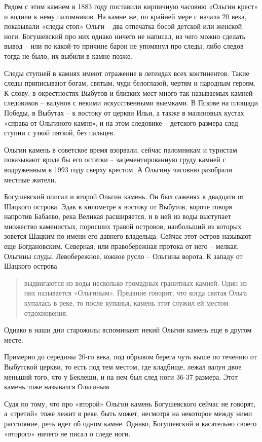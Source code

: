 Рядом с этим камнем в 1883 году поставили кирпичную часовню «Ольгин крест» и водили к нему паломников. На камне же, по крайней мере с начала 20 века, показывали «следы стоп» Ольги – два отпечатка босой детской или женской ноги. Богушевский про них однако ничего не написал, из чего можно сделать вывод – или по какой-то причине барон не упомянул про следы, либо следов тогда не было, их выбили в камне позже. 

Следы ступней в камнях имеют отражение в легендах всех континентов. Такие следы приписывают богам, святым, чуди белоглазой, чертям и народным героям. К слову, в окрестностях Выбутов и близких мест много так называемых камней-следовиков – валунов с некими искусственными выемками. В Пскове на площади Победы, в Выбутах – к востоку от церкви Ильи, а также в малиновых кустах «справа от Ольгиного камня», и на этом следовике – детского размера след ступни с узкой пяткой, без пальцев.

Ольгин камень в советское время взорвали, сейчас паломникам и туристам показывают вроде бы его остатки – зацементированную груду камней с водруженным в 1993 году сверху крестом. А Ольгину часовню разобрали местные жители.

Богушевский описал и второй Ольгин камень. Он был саженях в двадцати от Шацкого острова. Эдак в километре к востоку от Выбутов, короче говоря напротив Бабаево, река Великая расширяется, и в ней из воды выступает множество каменистых, поросших травой островов, наибольший из которых зовется Шацким по имени его давнего владельца. Сейчас этот остров называют еще Богдановским. Северная, или правобережная протока от него – мелкая, Ольгины слуды. Левобережное, южное русло – Ольгины ворота. К западу от Шацкого острова

\begin{quotation} 
выдвигаются из воды несколько громадных гранитных камней. Один из них называется «Ольгиным». Предание говорит, что когда святая Ольга купалась в реке, то после купанья, камень этот служил ей местом отдохновения.
\end{quotation} 

Однако в наши дни старожилы вспоминают некий  Ольгин камень еще в другом месте. 

Примерно до середины 20-го века, под обрывом берега чуть выше по течению от Выбутской церкви, то есть под тем местом, где кладбище, лежал валун двое меньший того, что у Беклеши, и на нем был след ноги 36-37 размера. Этот камень тоже назывался Ольгиным.

Судя по тому, что про «второй» Ольгин камень Богушевского сейчас не говорят, а «третий» тоже лежит в реке, быть может, несмотря на некоторое между ними расстояние, речь идет об одном камне. Однако, Богушевский и касательно своего «второго» ничего не писал о следе ноги.


